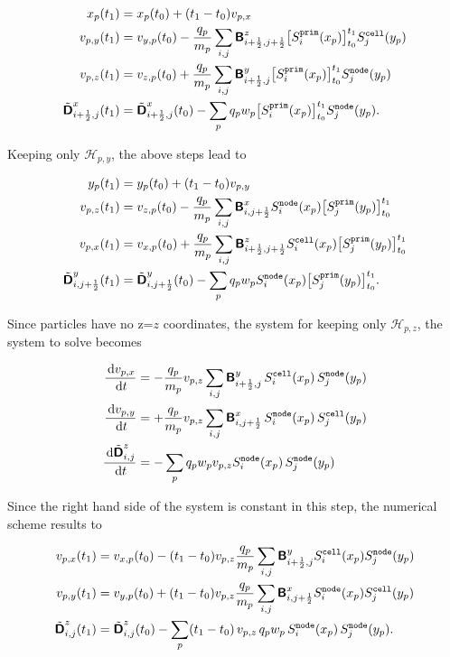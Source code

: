 \documentclass[11pt]{article}
\newcommand{\cell}{\texttt{cell}}
\newcommand{\node}{\texttt{node}}
\newcommand{\prim}{\texttt{prim}}
\begin{document}
$$
\begin{aligned}
    x_p&(t_1) = x_p(t_0) + (t_1-t_0) v_{p,x} \\
    v_{p, y}&(t_1) = v_{y,p}(t_0) -  
    \frac{q_p}{m_p} \sum_{i,j} \arrB^{z}_{\iph,\jph} \big[S^\prim_i(x_p)\big]_{t_0}^{t_1} S^\cell_j(y_p)    
    \\
    v_{p, z}&(t_1) =  v_{z,p}(t_0) + 
    \frac{q_p}{m_p} \sum_{i,j} \arrB^{y}_{\iph,j} \big[S^\prim_i(x_p)\big]_{t_0}^{t_1}  S^\node_j(y_p) 
    \\
    \tilde{\arrD}^{x}_{\iph,j} & (t_1) =  \tilde{\arrD}^{x}_{\iph,j}(t_0) - 
    \sum_p q_p w_p \big[S^\prim_i(x_p)\big]_{t_0}^{t_1}  S^\node_j(y_p).
\end{aligned}
$$

Keeping only $\mathcal{H}_{p,y}$, the above steps lead to

$$
\begin{aligned}
    y_p&(t_1) = y_p(t_0) + (t_1-t_0) v_{p,y} \\
    v_{p,z}&(t_1) = v_{z,p}(t_0) -  
    \frac{q_p}{m_p} \sum_{i,j} \arrB^{x}_{i,\jph} S^\node_i(x_p) \big[S^\prim_j(y_p)\big]_{t_0}^{t_1}     
    \\
    v_{p,x}&(t_1) =  v_{x,p}(t_0) + 
    \frac{q_p}{m_p} \sum_{i,j} \arrB^{z}_{\iph,\jph} S^\cell_i(x_p) \big[S^\prim_j(y_p)\big]_{t_0}^{t_1}   
    \\
    \tilde{\arrD}^{y}_{i,\jph} & (t_1) =  \tilde{\arrD}^{y}_{i,\jph}(t_0) - 
    \sum_p q_p w_p S^\node_i(x_p) \big[S^\prim_j(y_p)\big]_{t_0}^{t_1}.
\end{aligned}
$$

Since particles have no z=$z$ coordinates, the system for keeping only $\mathcal{H}_{p,z}$, the system to solve becomes

$$
\begin{aligned}
    \fract{v_{p,x}}{t} &= -\frac{q_p}{m_p} v_{p,z} \sum_{i,j} \arrB^{y}_{\iph,j} \,S^\cell_i(x_p)\,S^\node_j(y_p)\\
    \fract{v_{p,y}}{t} &= +\frac{q_p}{m_p} v_{p,z} \sum_{i,j} \arrB^{x}_{i,\jph} \,S^\node_i(x_p)\,S^\cell_j(y_p)\\
    \fract{\tilde{\arrD}^{z}_{i,j}}{t} &= - \sum_p q_p w_p v_{p,z} S^\node_i(x_p)\, S^\node_j(y_p)  
\end{aligned}
$$

Since the right hand side of the system is constant in this step, the numerical scheme results to 

$$
\begin{aligned}
    v_{p,x}&(t_1) = v_{x,p}(t_0) -  
    (t_1 - t_0) v_{p,z} \frac{q_p}{m_p} \sum_{i,j} \arrB^{y}_{\iph,j} S^\cell_i(x_p) S^\node_j(y_p)     
    \\
    v_{p,y}&(t_1) =  v_{y,p}(t_0) + 
    (t_1 - t_0) v_{p,z} \frac{q_p}{m_p} \sum_{i,j} \arrB^{x}_{i,\jph} S^\node_i(x_p) S^\cell_j(y_p)   
    \\
    \tilde{\arrD}^{z}_{i,j} & (t_1) =  \tilde{\arrD}^{z}_{i,j}(t_0) - 
    \sum_p (t_1 - t_0) \, v_{p,z} \,q_p w_p \,S^\node_i(x_p) \, S^\node_j(y_p).
\end{aligned}
$$
\end{document}
